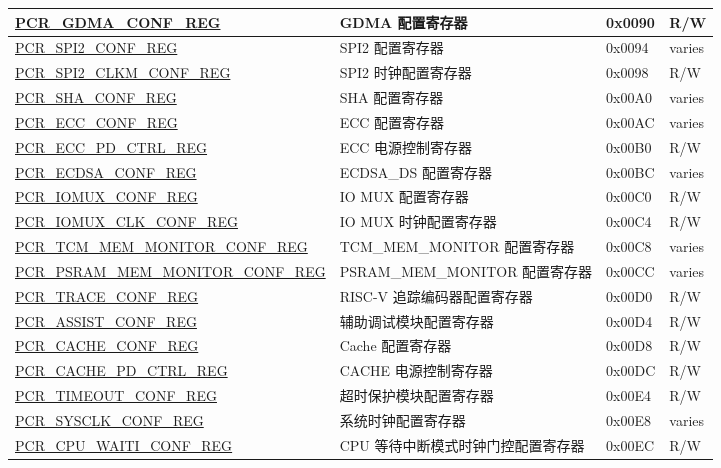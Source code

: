 \begin{longtable}{ | p{7cm} | p{6.2cm} | p{1.3cm} | p{1cm} | }
\hyperref[regdesc:PCRGDMACONFREG]{PCR\_GDMA\_CONF\_REG} & GDMA 配置寄存器 & 0x0090 & R/W \\ \hline
\hyperref[regdesc:PCRSPI2CONFREG]{PCR\_SPI2\_CONF\_REG} & SPI2 配置寄存器 & 0x0094 & varies \\ \hline
\hyperref[regdesc:PCRSPI2CLKMCONFREG]{PCR\_SPI2\_CLKM\_CONF\_REG} & SPI2 时钟配置寄存器 & 0x0098 & R/W \\ \hline
\hyperref[regdesc:PCRSHACONFREG]{PCR\_SHA\_CONF\_REG} & SHA 配置寄存器 & 0x00A0 & varies \\ \hline
\hyperref[regdesc:PCRECCCONFREG]{PCR\_ECC\_CONF\_REG} & ECC 配置寄存器 & 0x00AC & varies \\ \hline
\hyperref[regdesc:PCRECCPDCTRLREG]{PCR\_ECC\_PD\_CTRL\_REG} & ECC 电源控制寄存器 & 0x00B0 & R/W \\ \hline
\hyperref[regdesc:PCRECDSACONFREG]{PCR\_ECDSA\_CONF\_REG} & ECDSA\_DS 配置寄存器 & 0x00BC & varies \\ \hline
\hyperref[regdesc:PCRIOMUXCONFREG]{PCR\_IOMUX\_CONF\_REG} & IO MUX 配置寄存器 & 0x00C0 & R/W \\ \hline
\hyperref[regdesc:PCRIOMUXCLKCONFREG]{PCR\_IOMUX\_CLK\_CONF\_REG} & IO MUX 时钟配置寄存器 & 0x00C4 & R/W \\ \hline
\hyperref[regdesc:PCRTCMMEMMONITORCONFREG]{PCR\_TCM\_MEM\_MONITOR\_CONF\_REG} & TCM\_MEM\_MONITOR 配置寄存器 & 0x00C8 & varies \\ \hline
\hyperref[regdesc:PCRPSRAMMEMMONITORCONFREG]{PCR\_PSRAM\_MEM\_MONITOR\_CONF\_REG} & PSRAM\_MEM\_MONITOR 配置寄存器 & 0x00CC & varies \\ \hline
\hyperref[regdesc:PCRTRACECONFREG]{PCR\_TRACE\_CONF\_REG} & RISC-V 追踪编码器配置寄存器 & 0x00D0 & R/W \\ \hline
\hyperref[regdesc:PCRASSISTCONFREG]{PCR\_ASSIST\_CONF\_REG} & 辅助调试模块配置寄存器 & 0x00D4 & R/W \\ \hline
\hyperref[regdesc:PCRCACHECONFREG]{PCR\_CACHE\_CONF\_REG} & Cache 配置寄存器 & 0x00D8 & R/W \\ \hline
\hyperref[regdesc:PCRCACHEPDCTRLREG]{PCR\_CACHE\_PD\_CTRL\_REG} & CACHE 电源控制寄存器 & 0x00DC & R/W \\ \hline
\hyperref[regdesc:PCRTIMEOUTCONFREG]{PCR\_TIMEOUT\_CONF\_REG} & 超时保护模块配置寄存器 & 0x00E4 & R/W \\ \hline
\hyperref[regdesc:PCRSYSCLKCONFREG]{PCR\_SYSCLK\_CONF\_REG} & 系统时钟配置寄存器 & 0x00E8 & varies \\ \hline
\hyperref[regdesc:PCRCPUWAITICONFREG]{PCR\_CPU\_WAITI\_CONF\_REG} & CPU 等待中断模式时钟门控配置寄存器 & 0x00EC & R/W \\ \hline

\end{longtable}
